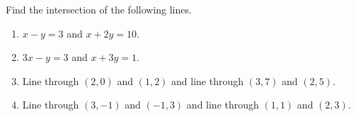 \begin{frame}
\begin{example}
Find the intersection of the following lines.
\begin{enumerate}
\item $x-y=3$ and $x+2y=10$.
\item $3x-y=3$ and $x+3y=1$.
\item Line through $(2,0)$ and $(1,2)$ and line through $(3,7 )$ and $(2,5)$.
\item Line through $(3,-1)$ and $(-1, 3)$ and line through $(1,1)$ and $(2,3)$.
\end{enumerate}

\end{example}

\end{frame}
